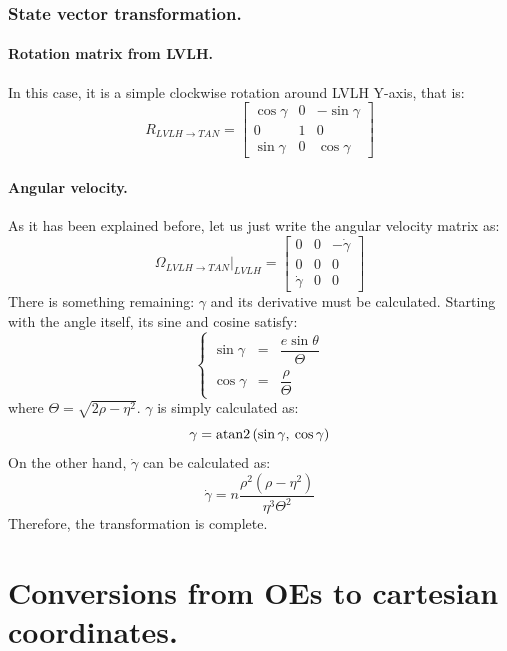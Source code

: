 		\subsubsection{State vector transformation.}
			\paragraph{Rotation matrix from LVLH. \\}
			\indent In this case, it is a simple clockwise rotation around LVLH Y-axis, that is:
			\[
			R_{LVLH\to TAN} = \left[ \begin{array}{ccc}
			\cos\gamma 	& 0	& -\sin\gamma\\
			0 			& 1	& 0 \\
			\sin\gamma	& 0 & \cos\gamma
			\end{array}\right]
			\]
			\paragraph{Angular velocity. \\}
			\indent As it has been explained before, let us just write the angular velocity matrix as:
			\[
			\Omega_{LVLH\to TAN}\rvert_{LVLH} = \left[ \begin{array}{ccc}
			0 			& 0	& -\dot{\gamma}\\
			0 			& 0 & 0 \\
			\dot{\gamma}& 0 & 0
			\end{array}\right]
			\] 
			\indent There is something remaining: $\gamma$ and its derivative must be calculated. Starting with the angle itself, its sine and cosine satisfy:
			\[
			\left\{
			\begin{array}{ccc}
			\sin\gamma & = & \dfrac{e \sin \theta}{\Theta} \\
			\cos\gamma & = & \dfrac{\rho}{\Theta}
			\end{array}
			\right.
			\]
			\noindent where $\Theta = \sqrt{2 \rho - \eta^2}$. $\gamma$ is simply calculated as:
			\[\gamma = \text{atan2}\left(\sin\gamma ,\: \cos\gamma\right)\]
			\indent On the other hand, $\dot{\gamma}$ can be calculated as:
			\[
			\dot{\gamma} = n \dfrac{\rho^2 \left( \rho - \eta^2\right)}{\eta^3 \Theta^2}
			\]
			\indent Therefore, the transformation is complete.
\section{Conversions from OEs to cartesian coordinates.}
%
%

